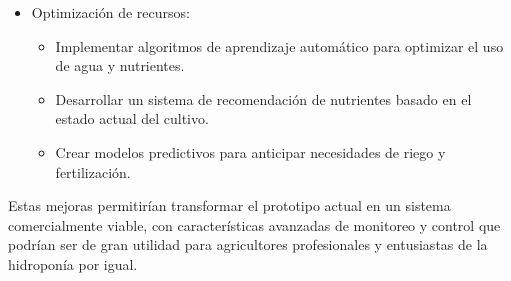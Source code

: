 \begin{itemize}
    \item Optimización de recursos:
    \begin{itemize}
        \item Implementar algoritmos de aprendizaje automático para optimizar el uso de agua y nutrientes.
        \item Desarrollar un sistema de recomendación de nutrientes basado en el estado actual del cultivo.
        \item Crear modelos predictivos para anticipar necesidades de riego y fertilización.
    \end{itemize}
\end{itemize}

Estas mejoras permitirían transformar el prototipo actual en un sistema comercialmente viable, con características avanzadas de monitoreo y control que podrían ser de gran utilidad para agricultores profesionales y entusiastas de la hidroponía por igual.
